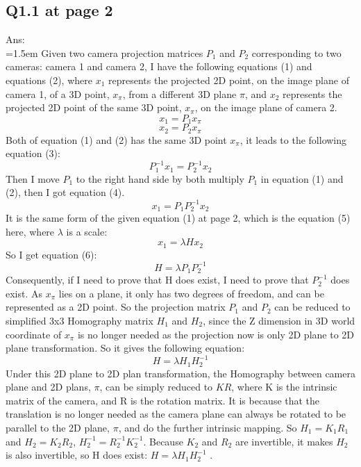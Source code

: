 \documentclass{article}
\begin{document}
	\subsection*{Q1.1 at page 2}
	Ans:\\
	\hangindent=1.5em \hspace{1.5em} Given two camera projection matrices $P_1$ and $P_2$ corresponding to two cameras: camera 1 and camera 2, I have the following equations (1) and equations (2), where $x_1$ represents the projected 2D point, on the image plane of camera 1, of a 3D point, $x_\pi$, from a different 3D plane $\pi$, and $x_2$ represents the projected 2D point of the same 3D point, $x_\pi$, on the image plane of camera 2. 
	\begin{equation}
		x_1 = P_1 x_\pi
	\end{equation}
		\begin{equation}
		x_2 = P_2 x_\pi
	\end{equation}
	Both of equation (1) and (2) has the same 3D point $x_\pi$, it leads to the following equation (3):
	\begin{equation}
		P_1^{-1}x_1 = P_2^{-1} x_2
	\end{equation}
	Then I move $P_1$ to the right hand side by both multiply $P_1$ in equation (1) and (2), then I got equation (4).
	\begin{equation}
		x_1 = P_1 P^{-1}_2 x_2
	\end{equation}
	It is the same form of the given equation (1) at page 2, which is the equation (5) here, where $\lambda$ is a scale:
	\begin{equation}
		x_1 = \lambda H x_2
	\end{equation}
	So I get equation (6):
	\begin{equation}
		H = \lambda P_1 P_2^{-1}
	\end{equation}
	Consequently, if I need to prove that H does exist, I need to prove that $P_2^{-1}$ does exist.
	As $x_\pi$ lies on a plane, it only has two degrees of freedom, and can be represented as a 2D point. So the projection matrix $P_1$ and $P_2$ can be reduced to simplified 3x3 Homography matrix $H_1$ and $H_2$, since the Z dimension in 3D world coordinate of $x_\pi$ is no longer needed as the projection now is only 2D plane to 2D plane transformation. So it gives the following equation:
	\begin{equation}
		H = \lambda H_1 H_2^{-1}
	\end{equation}
	Under this 2D plane to 2D plan transformation, the Homography between camera plane and 2D plans, $\pi$, can be simply reduced to $KR$, where K is the intrinsic matrix of the camera, and R is the rotation matrix. It is because that the translation is no longer needed as the camera plane can always be rotated to be parallel to the 2D plane, $\pi$, and do the further intrinsic mapping. So $H_1 = K_1R_1$ and $H_2 = K_2R_2$, $H_2^{-1} = R_2^{-1}K_2^{-1}$. Because $K_2$ and $R_2$ are invertible, it makes $H_2$ is also invertible, so H does exist: $H = \lambda H_1 H_2^{-1}$ .
	
\end{document}
